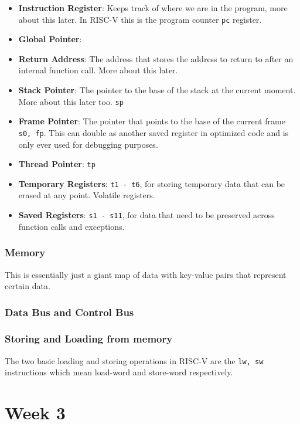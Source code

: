 \documentclass{article}
\begin{document}
\begin{itemize}
	\item \textbf{Instruction Register}: Keeps track of where we are in the program, more about this later. In RISC-V this is the program counter \verb|pc| register. %
	\item \textbf{Global Pointer}: %
	\item \textbf{Return Address}: The address that stores the address to return to after an internal function call. More about this later. %
	\item \textbf{Stack Pointer}: The pointer to the base of the stack at the current moment. More about this later too. \verb|sp| %
	\item \textbf{Frame Pointer}: The pointer that points to the base of the current frame \verb|s0, fp|. This can double as another saved register in optimized code and is only ever used for debugging purposes.
	\item \textbf{Thread Pointer}: \verb|tp|%
	\item \textbf{Temporary Registers}: \verb|t1 - t6|, for storing temporary data that can be erased at any point. Volatile registers.
	\item \textbf{Saved Registers}: \verb|s1 - s11|, for data that need to be preserved across function calls and exceptions.
\end{itemize}
\subsubsection{Memory}
This is essentially just a giant map of data with key-value pairs that represent certain data.

\subsubsection{Data Bus and Control Bus}

\subsubsection{Storing and Loading from memory}
The two basic loading and storing operations in RISC-V are the \verb*|lw, sw| instructions which mean load-word and store-word respectively.%


\section{Week 3}
\end{document}
